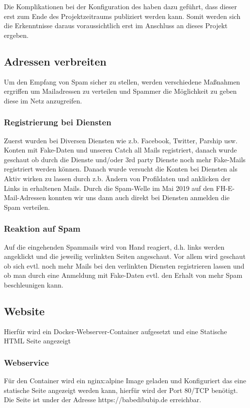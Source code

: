 \documentclass[a4paper,11pt,singlespacing]{article}
\begin{document}
			Die Komplikationen bei der Konfiguration des  haben dazu geführt, dass dieser erst zum Ende des Projektzeitraums publiziert werden kann. Somit werden sich die Erkenntnisse daraus voraussichtlich erst im Anschluss an dieses Projekt ergeben.


	\subsection{Adressen verbreiten}\label{sec:UmsetzungAdressenverbreiten}
		Um den Empfang von Spam sicher zu stellen, werden verschiedene Maßnahmen ergriffen um Mailadressen zu verteilen und Spammer die Möglichkeit zu geben diese im Netz anzugreifen.

		\subsubsection{Registrierung bei Diensten}\label{AdressenVerbreitenRegistrierenDiensten}
		Zuerst wurden bei Diversen Diensten wie z.b. Facebook, Twitter, Parship usw. Konten mit Fake-Daten und unseren Catch all Mails registriert, danach wurde geschaut ob durch die Dienste und/oder 3rd party Dienste noch mehr Fake-Mails registriert werden können. Danach wurde versucht die Konten bei Diensten als Aktiv wirken zu lassen durch z.b. Ändern von Profildaten und anklicken der Links in erhaltenen Mails. Durch die Spam-Welle im Mai 2019 auf den FH-E-Mail-Adressen konnten wir uns dann auch direkt bei Diensten anmelden die Spam verteilen.
		
		\subsubsection{Reaktion auf Spam}\label{AdressenVerbreitenReaktionSpam}
		Auf die eingehenden Spammails wird von Hand reagiert, d.h. links werden angeklickt und die jeweilig verlinkten Seiten angeschaut. Vor allem wird geschaut ob sich evtl. noch mehr Mails bei den verlinkten Diensten registrieren lassen und ob man durch eine Anmeldung mit Fake-Daten evtl. den Erhalt von mehr Spam beschleunigen kann.
	
	\subsection{Website}\label{sec:UmsetzungWebsite}
		Hierfür wird ein Docker-Webserver-Container aufgesetzt und eine Statische HTML Seite angezeigt

		\subsubsection{Webservice}\label{WebsiteWebservice}
			Für den Container wird ein nginx:alpine Image geladen und Konfiguriert das eine statische Seite angezeigt werden kann, hierfür wird der Port 80/TCP benötigt.
			Die Seite ist under der Adresse https://babedibubip.de erreichbar.
\end{document}
